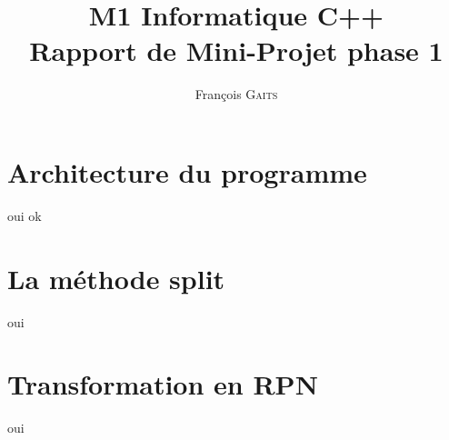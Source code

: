 \documentclass[]{article}
\author{François G\textsc{aits}}
\title{M1 Informatique C++\\Rapport de Mini-Projet phase 1}
\begin{document}
\maketitle

\section{Architecture du programme}
oui ok

\section{La méthode split}
oui

\section{Transformation en RPN}
oui
\end{document}
